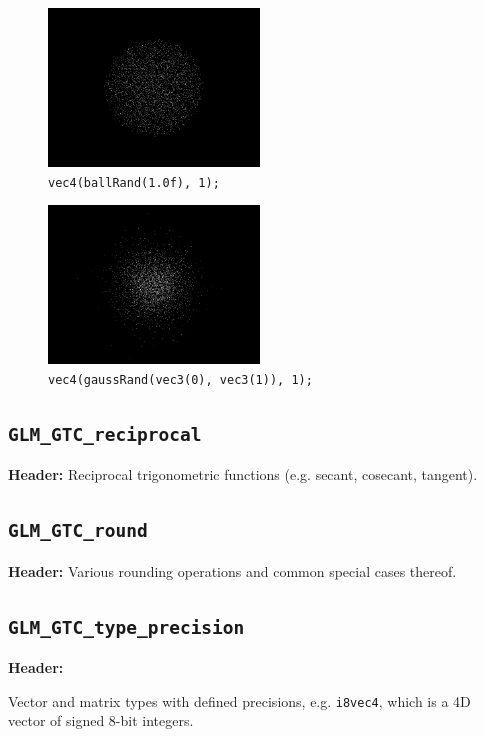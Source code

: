 \documentclass{scrartcl}
\numberwithin{figure}{subsection}
\begin{document}
\begin{figure}[h]
  \centering
  \includegraphics[width=0.5\textwidth]{ballrand}
  \cprotect\caption{\verb|vec4(ballRand(1.0f), 1);|}
\end{figure}

\begin{figure}[h]
  \centering
  \includegraphics[width=0.5\textwidth]{gaussrand}
  \cprotect\caption{\verb|vec4(gaussRand(vec3(0), vec3(1)), 1);|}
\end{figure}

\subsection{\texttt{GLM\_GTC\_reciprocal}}
\textbf{Header:} 
Reciprocal trigonometric functions (e.g. secant, cosecant, tangent).

\subsection{\texttt{GLM\_GTC\_round}}
\textbf{Header:} 
Various rounding operations and common special cases thereof.


\subsection{\texttt{GLM\_GTC\_type\_precision}}
\textbf{Header:} 

Vector and matrix types with defined precisions, e.g. \verb|i8vec4|, which is a 4D vector of signed 8-bit integers.
\end{document}
